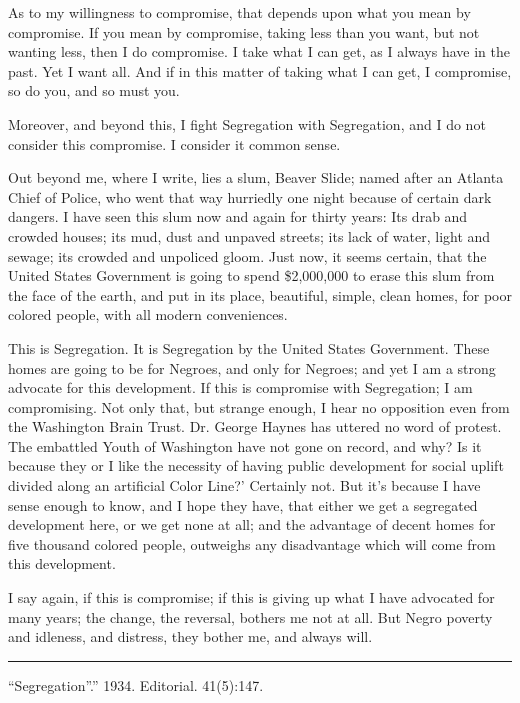 \documentclass[letterpaper,10pt,english]{jupyterBook}
\begin{document}
\sphinxAtStartPar
As to my willingness to compromise, that depends upon what you mean by compromise. If you mean by compromise, taking less than you want, but not wanting less, then I do compromise. I take what I can get, as I always have in the past. Yet I want all. And if in this matter of taking what I can get, I compromise, so do you, and so must you.

\sphinxAtStartPar
Moreover, and beyond this, I fight Segregation with Segregation, and I do not consider this compromise. I consider it common sense.

\sphinxAtStartPar
Out beyond me, where I write, lies a slum, Beaver Slide; named after an Atlanta Chief of Police, who went that way hurriedly one night because of certain dark dangers. I have seen this slum now and again for thirty years: Its drab and crowded houses; its mud, dust and unpaved streets; its lack of water, light and sewage; its crowded and unpoliced gloom. Just now, it seems certain, that the United States Government is going to spend \$2,000,000 to erase this slum from the face of the earth, and put in its place, beautiful, simple, clean homes, for poor colored people, with all modern conveniences.

\sphinxAtStartPar
This is Segregation. It is Segregation by the United States Government. These homes are going to be for Negroes, and only for Negroes; and yet I am a strong advocate for this development. If this is compromise with Segregation; I am compromising. Not only that, but strange enough, I hear no opposition even from the Washington Brain Trust. Dr. George Haynes has uttered no word of protest. The embattled Youth of Washington have not gone on record, and why? Is it because they or I like the necessity of having public development for social uplift divided along an artificial Color Line?’ Certainly not. But it’s because I have sense enough to know, and I hope they have, that either we get a segregated development here, or we get none at all; and the advantage of decent homes for five thousand colored people, outweighs any disadvantage which will come from this development.

\sphinxAtStartPar
I say again, if this is compromise; if this is giving up what I have advocated for many years; the change, the reversal, bothers me not at all. But Negro poverty and idleness, and distress, they bother me, and always will.


\bigskip\hrule\bigskip


\sphinxAtStartPar
{} “Segregation”.” 1934. Editorial.  41(5):147.
\end{document}
